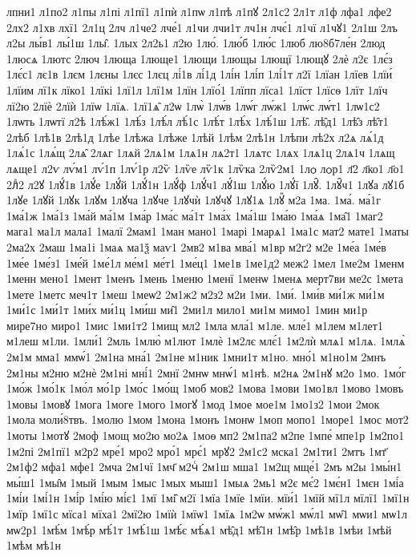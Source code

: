 {лпни1
л1по2
л1пы
л1пі
л1пї1
л1пѝ
л1пѡ
л1пѣ
л1пꙋ
2л1с2
2л1т
л1ф
лфа1
лфе2
2лх2
л1хв
лхї1
2л1ц
2лч
л1че2
лче́1
л1чи
лчи1т
лч1н
лчє́1
л1чї
л1чꙋ1
2л1ш
2лъ
л2ы
лы́в1
лы́1ш
1лы̑.
1лых
2л2ь1
л2ю
1лю́.
1лю́б
1лю́с
1люб
лю8б7ле́н
2люд
1люсѧ
1лютс
2люч
1люща
1люще1
1лющи
1лющы
1лющї
1лющꙋ
2лѐ
л2є
1лє́з
1лє́с1
лє1в
1лєм
1лєны
1лєс
1лєц
лі́1в
лі́1д
1лі́н
1лі́п
1лі́1т
л2ї
1лїан
1лїев
1лїи́
1лїим
лї1к
лїко1
1лїкі
1лї1л
1лї1м
1лїн
1лїо́1
1лїпп
лїса1
1лїст
1лїсѳ
1лїт
1лїч
лї2ю
2лїѐ
2лїѝ
1лїѡ
1лїѧ.
1лї1ѧ̑
л2ѡ
1лѡ̀
1лѡ́в
1лѡ́г
лѡ́ж1
1лѡ́с
лѡ́т1
1лѡ1с2
1лѡть
1лѡтї
л2ѣ
1лѣ́ж1
1лѣ́з
1лѣ́л
лѣ́1с
1лѣ́т
1лѣ́х
1лѣ́1ш
1лѣ̑.
лѣ̑д1
1лѣ̑з
лѣ̑т1
2лѣб
1лѣ1в
2лѣ1д
1лѣе
1лѣжа
1лѣже
1лѣй
1лѣм
2лѣ1н
1лѣпи
лѣ2х
л2ѧ
лѧ́1д
1лѧ́1с
1лѧ́щ
2лѧ̑
2лѧг
1лѧй
2лѧ1м
1лѧ1н
лѧ2т1
1лѧтс
1лѧх
1лѧ1ц
2лѧ1ч
1лѧщ
лѧще1
л2ѵ
лѵ́м1
лѵ́1п
1лѵ́1р
л2ѷ
1лѷе
лѷ1к
1лѷка
2лѷ2м1
1лѻ
лѻр1
л҃2
л҃ко1
л҃о1
2лⷣ2
л2ꙋ
1лꙋ́1в
1лꙋ́е
1лꙋ́й
1лꙋ́1н
1лꙋ́ф
1лꙋ́ч1
лꙋ́1ш
1лꙋ́ю
1лꙋ́ї
1лꙋ̑.
1лꙋ̑ч1
1лꙋа
лꙋ1б
1лꙋе
1лꙋй
1лꙋк
1лꙋм
1лꙋча
1лꙋче
1лꙋчѝ
1лꙋчꙋ
1лꙋ1ѧ
1лꙋⷩ
м2а
1ма.
1ма́.
ма́1г
1ма́1ж
1ма́1з
1ма́й
ма́1м
1ма́р
1ма́с
ма́1т
1ма́х
1ма́1ш
1ма́ю
1ма́ѧ
1ма̑1
1маг2
мага1
ма1л
мала1
1малї
2мам1
1ман
мано1
1марі
1марѧ1
1ма1с
мат2
мате1
1маты
2ма2х
2маш
1ма1і
1маѧ
ма1ѯ
маѵ1
2мв2
м1ва
мва́1
м1вр
м2г2
м2е
1ме́а
1ме́в
1ме́е
1ме́з1
1ме́й
1ме́1л
ме́м1
ме́т1
1ме́ц1
1ме1в
1ме1д2
меж2
1мел
1ме2м
1менм
1менн
мено1
1мент
1менъ
1мень
1меню
1менї
1менѡ
1менѧ
мерт7ви
ме2с
1мета
1мете
1метс
меч1т
1меш
1меѡ2
2м1ж2
м2з2
м2и
1ми.
1ми́.
1ми́в
ми́1ж
ми́1м
1ми́1с
1ми́1т
1ми́х
ми́1ц
1ми́ш
ми̑1
2ми1л
мило1
ми1м
мимо1
1мин
ми1р
мире7но
миро1
1мис
1ми1т2
1мищ
мл2
1мла
мла́1
м1ле.
мле́1
м1лем
м1лет1
м1леш
м1ли.
1мли́1
2мль
1млю̀
м1лют
1млѐ
1м2лє
млє́1
1м2лѝ
млѧ1
м1лѧ.
1млѧ̀
2м1м
мма1
ммѡ́1
2м1на
мна́1
2м1не
м1ник
1мни1т
м1но.
мно́1
м1но1м
2мнъ
2м1ны
м2ню
м2нѐ
2м1ні
мні́1
2мнї
2мнѡ
мнѡ́1
м1нѣ.
м2нѧ
2м1нꙋ
м2о
1мо.
1мо́г
1мо́ж
1мо́1к
1мо́л
мо́1р
1мо́с
1мо́щ
1моб
мов2
1мова
1мови
1мо1вл
1мово
1мовъ
1мовы
1мовꙋ
1мога
1моге
1мого
1могꙋ
1мод
1мое
мое1м
1мо1з2
1мои
2мок
1мола
моли́8твъ.
1молю
1мом
1мона
1монъ
1монѡ
1моп
мопо1
1море1
1мос
мот2
1моты
1мотꙋ
2моф
1мощ
мо2ю
мо2ѧ
1моѳ
мп2
2м1па2
м2пе
1мпе́
мпе1р
1м2по1
1м2пі
2м1пї1
м2р2
мре́1
мро2
мро́1
мрє́1
мрꙋ2
2м1с2
мска1
2м1ти1
2мтъ
1мт҃
2м1ф2
мфа1
мфе1
2мча
2м1чї
1мч҃
м2чⷭ
2м1ш
мша1
1м2щ
мще́1
2мъ
м2ы
1мы́н1
мы́ш1
1мы̑м
1мый
1мым
1мыс
1мых
мыш1
1мыѧ
2мь1
м2є
мє́2
1мє́н1
1мєн
1мі́а
1мі́и
1мі́1н
1мі́р
1мі́ю
мі́є1
1мї
1мі̑
м2ї
1мїа
1мїе
1мїи.
мїи́1
1мїй
мї1л
мїлї1
1мї1н
1мїр
1мї1с
мїса1
мїха1
2мї2ю
1мїѝ
1мїѡ1
1мїѧ
1м2ѡ
мѡ́ж1
мѡ́л1
мѡ̑1
мѡи1
мѡ1л
мѡ2р1
1мѣ́м
1мѣ́р
мѣ́1т
1мѣ́1ш
1мѣ́є
мѣ́ѧ1
мѣ̑д1
мѣ̑1н
1мѣ̑р
1мѣ1в
1мѣи
1мѣй
1мѣм
мѣ1н
}
